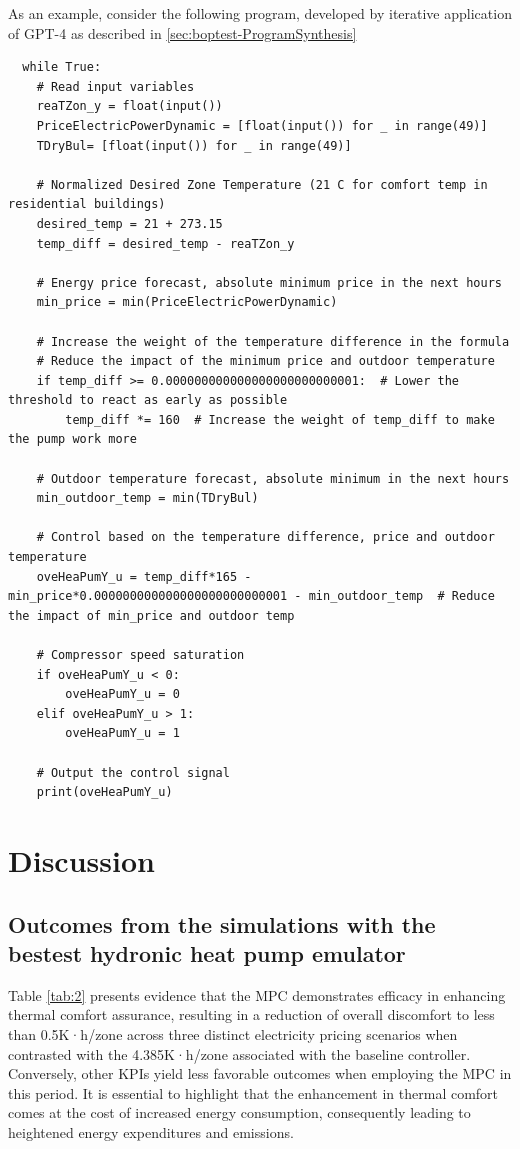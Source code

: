 As an example, consider the following program, developed by iterative application of GPT-4 as described in \ref{sec:boptest-ProgramSynthesis}

\begin{lstlisting}
  while True:
    # Read input variables
    reaTZon_y = float(input())
    PriceElectricPowerDynamic = [float(input()) for _ in range(49)]
    TDryBul= [float(input()) for _ in range(49)]

    # Normalized Desired Zone Temperature (21 C for comfort temp in residential buildings)
    desired_temp = 21 + 273.15
    temp_diff = desired_temp - reaTZon_y

    # Energy price forecast, absolute minimum price in the next hours
    min_price = min(PriceElectricPowerDynamic)

    # Increase the weight of the temperature difference in the formula
    # Reduce the impact of the minimum price and outdoor temperature
    if temp_diff >= 0.000000000000000000000000001:  # Lower the threshold to react as early as possible
        temp_diff *= 160  # Increase the weight of temp_diff to make the pump work more

    # Outdoor temperature forecast, absolute minimum in the next hours
    min_outdoor_temp = min(TDryBul)

    # Control based on the temperature difference, price and outdoor temperature
    oveHeaPumY_u = temp_diff*165 - min_price*0.000000000000000000000000001 - min_outdoor_temp  # Reduce the impact of min_price and outdoor temp

    # Compressor speed saturation
    if oveHeaPumY_u < 0:
        oveHeaPumY_u = 0
    elif oveHeaPumY_u > 1:
        oveHeaPumY_u = 1

    # Output the control signal
    print(oveHeaPumY_u)
\end{lstlisting}

\newpage
\section{Discussion}
\label{sec:boptest-discussion}

\subsection{Outcomes from the simulations with the bestest hydronic heat pump emulator}

Table \ref{tab:2} presents evidence that the MPC demonstrates efficacy in enhancing thermal comfort assurance, resulting in a reduction of overall discomfort to less than 0.5K·h/zone across three distinct electricity pricing scenarios when contrasted with the 4.385K·h/zone associated with the baseline controller. Conversely, other KPIs yield less favorable outcomes when employing the MPC in this period. It is essential to highlight that the enhancement in thermal comfort comes at the cost of increased energy consumption, consequently leading to heightened energy expenditures and emissions.

